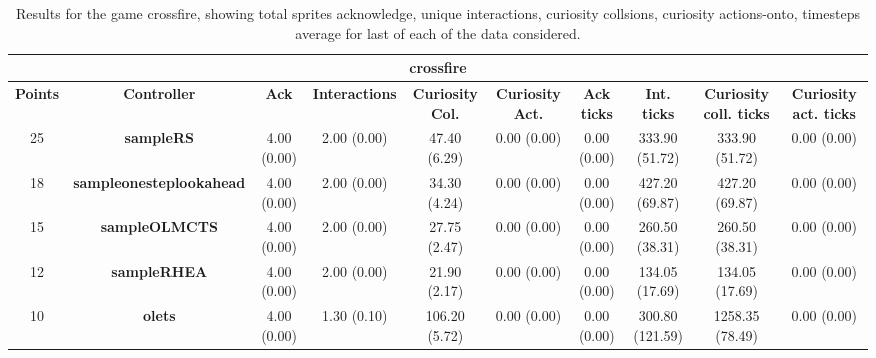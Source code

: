 \begin{table*}[!t]
\begin{center}
\begin{adjustbox}{width=1\textwidth}
\begin{tabular}{|c|c|c|c|c|c|c|c|c|c|}
\multicolumn{10}{c}{\textbf{crossfire}}\\
\hline
\textbf{Points} & \textbf{Controller} & \textbf{Ack} & \textbf{Interactions} & \textbf{Curiosity Col.} & \textbf{Curiosity Act.} & \textbf{Ack ticks} & \textbf{Int. ticks} & \textbf{Curiosity coll. ticks} & \textbf{Curiosity act. ticks}\\
\hline
25 & \textbf{sampleRS} & 4.00 (0.00) & 2.00 (0.00) & 47.40 (6.29) & 0.00 (0.00) & 0.00 (0.00) & 333.90 (51.72) & 333.90 (51.72) & 0.00 (0.00)
 \\
\hline
18 & \textbf{sampleonesteplookahead} & 4.00 (0.00) & 2.00 (0.00) & 34.30 (4.24) & 0.00 (0.00) & 0.00 (0.00) & 427.20 (69.87) & 427.20 (69.87) & 0.00 (0.00)
 \\
\hline
15 & \textbf{sampleOLMCTS} & 4.00 (0.00) & 2.00 (0.00) & 27.75 (2.47) & 0.00 (0.00) & 0.00 (0.00) & 260.50 (38.31) & 260.50 (38.31) & 0.00 (0.00)
 \\
\hline
12 & \textbf{sampleRHEA} & 4.00 (0.00) & 2.00 (0.00) & 21.90 (2.17) & 0.00 (0.00) & 0.00 (0.00) & 134.05 (17.69) & 134.05 (17.69) & 0.00 (0.00)
 \\
\hline
10 & \textbf{olets} & 4.00 (0.00) & 1.30 (0.10) & 106.20 (5.72) & 0.00 (0.00) & 0.00 (0.00) & 300.80 (121.59) & 1258.35 (78.49) & 0.00 (0.00)
 \\
\hline
\end{tabular}
\end{adjustbox}
\caption{Results for the game crossfire, showing total sprites acknowledge, unique interactions, curiosity collsions, curiosity actions-onto, timesteps average for last of each of the data considered.}
\label{tab:weights}
\end{center}
\end{table*}
